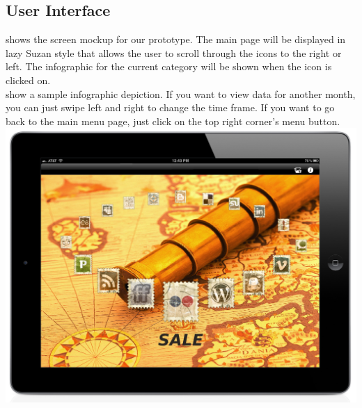 \documentclass[11pt,a4paper,oneside]{article}
\begin{document}
\subsection{User Interface}

shows the screen mockup for our prototype.  The main page will be displayed in lazy Suzan style that allows the user to scroll through the icons to the right or left.  The infographic for the current category will be shown when the icon is clicked on.\\


show a sample infographic depiction.  If you want to view data for another month, you can just swipe left and right to change the time frame.  If you want to go back to the main menu page, just click on the top right corner’s menu button.\\


\includegraphics[width=1\textwidth]{images/screen.jpg}\\
\end{document}
